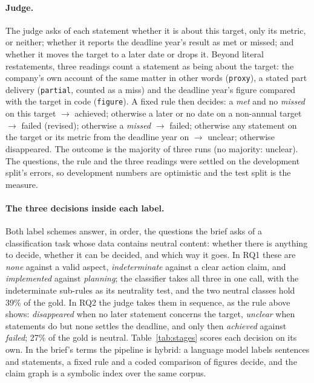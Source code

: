 \documentclass[11pt]{article}
\begin{document}
\paragraph{Judge.}
The judge asks of each statement whether it is about this target, only its metric, or neither; whether it reports the deadline year's result as met or missed; and whether it moves the target to a later date or drops it. Beyond literal restatements, three readings count a statement as being about the target: the company's own account of the same matter in other words (\texttt{proxy}), a stated part delivery (\texttt{partial}, counted as a miss) and the deadline year's figure compared with the target in code (\texttt{figure}). A fixed rule then decides: a \emph{met} and no \emph{missed} on this target $\to$ achieved; otherwise a later or no date on a non-annual target $\to$ failed (revised); otherwise a \emph{missed} $\to$ failed; otherwise any statement on the target or its metric from the deadline year on $\to$ unclear; otherwise disappeared. The outcome is the majority of three runs (no majority: unclear). The questions, the rule and the three readings were settled on the development split's errors, so development numbers are optimistic and the test split is the measure.

\paragraph{The three decisions inside each label.}
\label{sec:decisions}
Both label schemes answer, in order, the questions the brief asks of a classification task whose data contains neutral content: whether there is anything to decide, whether it can be decided, and which way it goes. In RQ1 these are \emph{none} against a valid aspect, \emph{indeterminate} against a clear action claim, and \emph{implemented} against \emph{planning}; the classifier takes all three in one call, with the indeterminate sub-rules as its neutrality test, and the two neutral classes hold 39\% of the gold. In RQ2 the judge takes them in sequence, as the rule above shows: \emph{disappeared} when no later statement concerns the target, \emph{unclear} when statements do but none settles the deadline, and only then \emph{achieved} against \emph{failed}; 27\% of the gold is neutral. Table~\ref{tab:stages} scores each decision on its own. In the brief's terms the pipeline is hybrid: a language model labels sentences and statements, a fixed rule and a coded comparison of figures decide, and the claim graph is a symbolic index over the same corpus.
\end{document}

